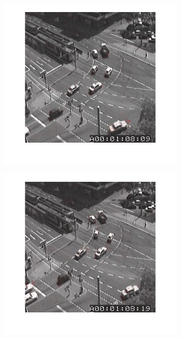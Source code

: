 \documentclass[a4paper]{iacas}
\begin{document}
\begin{figure}[!htbp]
	
	\centering
	\begin{subfigure}[b]{0.4\textwidth}
		\includegraphics[width=\textwidth]{407.jpg}
		\caption{}
		\label{fig:407}
	\end{subfigure}
	\begin{subfigure}[b]{0.4\textwidth}
		\includegraphics[width=\textwidth]{408.jpg}
		\caption{}
		\label{fig:408}
	\end{subfigure}
	

\end{figure}
\end{document}
